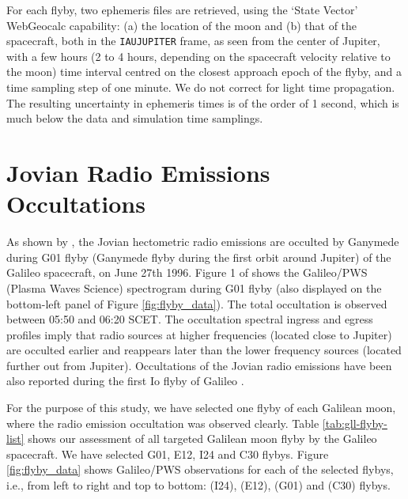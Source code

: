 \documentclass[referee]{aa}
\begin{document}
For each flyby, two ephemeris files are retrieved, using the `State Vector' WebGeocalc capability: (a) the location of the moon and (b) that of the spacecraft, both in the \texttt{IAU\textunderscore JUPITER} frame, as seen from the center of Jupiter, with a few hours (2 to 4 hours, depending on the spacecraft velocity relative to the moon) time interval centred on the closest approach epoch of the flyby, and a time sampling step of one minute. We do not correct for light time propagation. The resulting uncertainty in ephemeris times is of the order of 1 second, which is much below the data and simulation time samplings.

\section{Jovian Radio Emissions Occultations}

As shown by \citet{Kurth:1997in}, the Jovian hectometric radio emissions are occulted by Ganymede during G01 flyby (Ganymede flyby during the first orbit around Jupiter) of the Galileo spacecraft, on June 27th 1996. Figure 1 of \citet{Kurth:1997in} shows the Galileo/PWS (Plasma Waves Science) \citep{gurnett_SSR_92} spectrogram during G01 flyby (also displayed on the bottom-left panel of Figure \ref{fig:flyby_data}). The total occultation is observed between 05:50 and 06:20 SCET. The occultation spectral ingress and egress profiles imply that radio sources at higher frequencies (located close to Jupiter) are occulted earlier and reappears later than the lower frequency sources (located further out from Jupiter). Occultations of the Jovian radio emissions have been also reported during the first Io flyby of Galileo \citep{louarn_GRL_97}. 

For the purpose of this study, we have selected one flyby of each Galilean moon, where the radio emission occultation was observed clearly. Table \ref{tab:gll-flyby-list} shows our assessment of all targeted Galilean moon flyby by the Galileo spacecraft. We have selected G01, E12, I24 and C30 flybys. Figure \ref{fig:flyby_data} shows Galileo/PWS observations for each of the selected flybys, i.e., from left to right and top to bottom:  (I24),  (E12),  (G01) and  (C30) flybys.
\end{document}
